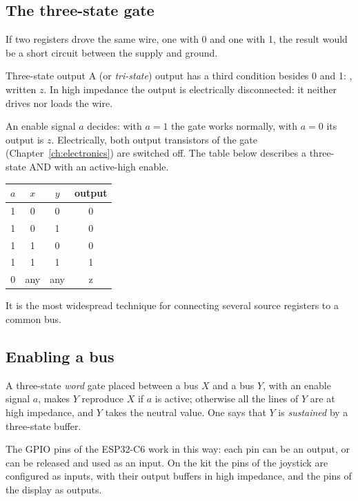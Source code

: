 \subsection{The three-state gate}

If two registers drove the same wire, one with 0 and one with 1, the result
would be a short circuit between the supply and ground.

\begin{definition}{Three-state output}
A  (or \emph{tri-state}) output has a third condition
besides 0 and 1: , written $z$. In high impedance the
output is electrically disconnected: it neither drives nor loads the wire.
\end{definition}

An enable signal $a$ decides: with $a=1$ the gate works normally, with $a=0$
its output is $z$. Electrically, both output transistors of the gate
(Chapter~\ref{ch:electronics}) are switched off. The table below describes a
three-state AND with an active-high enable.

\begin{center}\small\ttfamily
\begin{tabular}{ccc|c}
\textrm{$a$}&\textrm{$x$}&\textrm{$y$}&\textrm{output}\\\hline
1&0&0&0\\1&0&1&0\\1&1&0&0\\1&1&1&1\\\rowcolor{prgamber!15}0&\textrm{any}&\textrm{any}&z
\end{tabular}
\end{center}

It is the most widespread technique for connecting several source registers
to a common bus.

\subsection{Enabling a bus}

A three-state \emph{word} gate placed between a bus $X$ and a bus $Y$, with an
enable signal $a$, makes $Y$ reproduce $X$ if $a$ is active; otherwise all the
lines of $Y$ are at high impedance, and $Y$ takes the neutral value. One says
that $Y$ is \emph{sustained} by a three-state buffer.

\begin{prgmachine}
The GPIO pins of the ESP32-C6 work in this way: each pin can be an output, or
can be released and used as an input. On the kit the pins of the joystick are
configured as inputs, with their output buffers in high impedance, and the
pins of the display as outputs.
\end{prgmachine}

